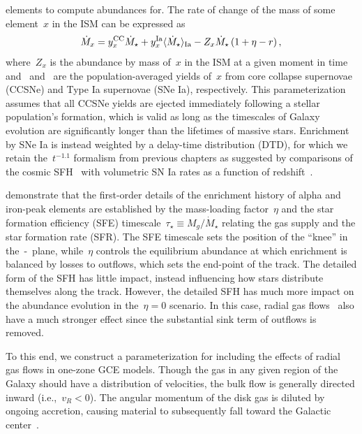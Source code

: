 elements to compute abundances for.
The rate of change of the mass of some element~$x$ in the ISM can be
expressed as
\begin{equation}
\dot{M}_x = y_\text{$x$}^\text{CC} \dot{M}_\star +
y_\text{$x$}^\text{Ia} \langle \dot{M}_\star \rangle_\text{Ia} -
Z_x \dot{M}_\star \left(1 + \eta - r\right),
\label{outflows:eq:mdot-element}
\end{equation}
where~$Z_x$ is the abundance by mass of~$x$ in the ISM at a given moment in
time and~ and~ are the population-averaged yields of~$x$
from core collapse supernovae (CCSNe) and Type Ia supernovae (SNe Ia),
respectively.
This parameterization assumes that all CCSNe yields are ejected immediately
following a stellar population's formation, which is valid as long as the
timescales of Galaxy evolution are significantly longer than the lifetimes
of massive stars.
Enrichment by SNe Ia is instead weighted by a delay-time distribution (DTD),
for which we retain the~$t^{-1.1}$ formalism from previous chapters as
suggested by comparisons of the cosmic SFH~\citep[e.g.,][]{Madau2017,
Driver2018} with volumetric SN Ia rates as a function of
redshift~\citep{Maoz2012a, Maoz2012b, Graur2013, Graur2014}.
\par
\citet{Weinberg2017b} demonstrate that the first-order details of the
enrichment history of alpha and iron-peak elements are established by
the mass-loading factor~$\eta$ and the star formation efficiency (SFE)
timescale~$\tau_\star \equiv M_g / \dot{M}_\star$ relating the
gas supply and the star formation rate (SFR).
The SFE timescale sets the position of the ``knee'' in the~\afe-\feh~plane,
while~$\eta$ controls the equilibrium abundance at which enrichment is
balanced by losses to outflows, which sets the end-point of the track.
The detailed form of the SFH has little impact, instead influencing how
stars distribute themselves along the track.
However, the detailed SFH has much more impact on the abundance evolution
in the~$\eta = 0$ scenario.
In this case, radial gas flows~\citep[e.g.,][]{Lacey1985}
also have a much stronger effect since the substantial sink term of
outflows is removed.
\par
To this end, we construct a parameterization for including the effects of
radial gas flows in one-zone GCE models.
Though the gas in any given region of the Galaxy should have a distribution of
velocities, the bulk flow is generally directed inward (i.e.,~$v_R < 0$).
The angular momentum of the disk gas is diluted by ongoing accretion, causing
material to subsequently fall toward the Galactic center~\citep{Bilitewski2012}.

